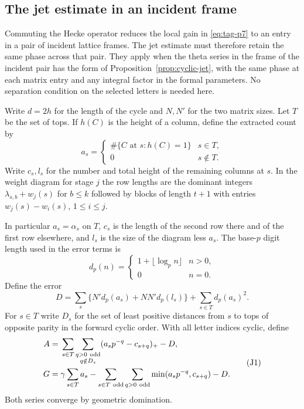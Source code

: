 \subsection{The jet estimate in an incident frame}
\label{subsec:hecke-entries}

Commuting the Hecke operator reduces the local gain in \eqref{eq:tag-p7} to an entry in a pair of incident lattice frames. The jet estimate must therefore retain the same phase across that pair. They apply when the
theta series in the frame of the incident pair has the form of
Proposition~\ref{prop:cyclic-jet}, with the same phase at each
matrix entry and any integral factor in the formal parameters.
No separation condition on the selected letters is needed here.

Write \(d=2h\) for the length of the cycle and \(N,N'\) for the
two matrix sizes. Let \(T\) be the set of tops. If \(h(C)\) is the height of a column, define the extracted count by
\[
  a_s=\begin{cases}\#\{C\text{ at }s:h(C)=1\}&s\in T,\\0&s\notin T.\end{cases}
\]
 Write \(c_s,l_s\) for the number
and total height of the remaining columns at \(s\).
In the weight diagram for stage \(j\) the row lengths are the
dominant integers \(\lambda_{s,b}+w_j(s)\) for \(b\le k\)
followed by blocks of length \(t+1\) with entries
\(w_j(s)-w_i(s)\), \(1\le i\le j\).

In particular
\(a_s=\alpha_s\) on \(T\), \(c_s\) is the length of the
second row there and of the first row elsewhere, and
\(l_s\) is the size of the diagram less \(a_s\).
The base-\(p\) digit length used in the error terms is
\[
  d_p(n)=\begin{cases}1+\lfloor\log_p n\rfloor&n>0,\\0&n=0.\end{cases}
\]
Define the error
\[
 D=\sum_s\{N'd_p(a_s)+NN'd_p(l_s)\}+\sum_{s\in T}d_p(a_s)^2 .
\]
For \(s\in T\) write \(D_s\) for the set of least positive distances
from \(s\) to tops of opposite parity in the forward cyclic order.
With all letter indices cyclic, define
\[
\begin{split}
 A={}&\sum_{s\in T}\sum_{\substack{q>0\ {\rm odd}\\q\notin D_s}}
                 (a_s p^{-q}-c_{s+q})_+-D,\\
 G={}&\gamma\sum_{s\in T}a_s-
       \sum_{s\in T\ {\rm odd}}\sum_{q>0\ {\rm odd}}
                 \min(a_sp^{-q},c_{s+q})-D .
\end{split}                                                     \tag{J1}\label{eq:tag-j1}
\]
Both series converge by geometric domination.

